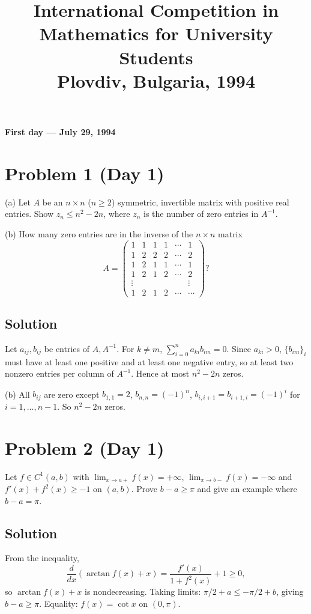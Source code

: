 \documentclass{article}
\title{International Competition in Mathematics for University Students\\
Plovdiv, Bulgaria, 1994}
\date{}
\begin{document}
\maketitle

\begin{center}\textbf{First day --- July 29, 1994}\end{center}

\section*{Problem 1 (Day 1)}
(a) Let $A$ be an $n\times n$ ($n\geq 2$) symmetric, invertible matrix with positive real entries. Show $z_n \leq n^2 - 2n$, where $z_n$ is the number of zero entries in $A^{-1}$.

(b) How many zero entries are in the inverse of the $n\times n$ matrix
\[
A = \begin{pmatrix}
1 & 1 & 1 & 1 & \cdots & 1\\
1 & 2 & 2 & 2 & \cdots & 2\\
1 & 2 & 1 & 1 & \cdots & 1\\
1 & 2 & 1 & 2 & \cdots & 2\\
\vdots & & & & & \vdots\\
1 & 2 & 1 & 2 & \cdots & \cdots
\end{pmatrix}?
\]

\subsection*{Solution}
Let $a_{ij}, b_{ij}$ be entries of $A, A^{-1}$. For $k \neq m$, $\sum_{i=0}^n a_{ki} b_{im} = 0$. Since $a_{ki} > 0$, $\{b_{im}\}_i$ must have at least one positive and at least one negative entry, so at least two nonzero entries per column of $A^{-1}$. Hence at most $n^2 - 2n$ zeros.

(b) All $b_{ij}$ are zero except $b_{1,1} = 2$, $b_{n,n} = (-1)^n$, $b_{i,i+1} = b_{i+1,i} = (-1)^i$ for $i = 1,\ldots,n-1$. So $n^2 - 2n$ zeros.

\section*{Problem 2 (Day 1)}
Let $f \in C^1(a,b)$ with $\lim_{x\to a+} f(x) = +\infty$, $\lim_{x\to b-}f(x) = -\infty$ and $f'(x) + f^2(x) \geq -1$ on $(a,b)$. Prove $b - a \geq \pi$ and give an example where $b - a = \pi$.

\subsection*{Solution}
From the inequality,
\[
\frac{d}{dx}(\arctan f(x) + x) = \frac{f'(x)}{1 + f^2(x)} + 1 \geq 0,
\]
so $\arctan f(x) + x$ is nondecreasing. Taking limits: $\pi/2 + a \leq -\pi/2 + b$, giving $b - a \geq \pi$. Equality: $f(x) = \cot x$ on $(0, \pi)$.
\end{document}
